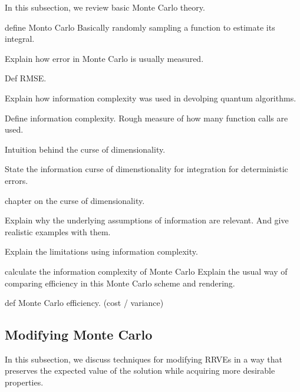 \documentclass[a4paper,12pt]{article}
\begin{document}
In this subsection, we review basic Monte Carlo theory. \\

\begin{definition}
    define Monto Carlo
    Basically randomly sampling a function to estimate its integral.
\end{definition}

Explain how error in Monte Carlo is usually measured.
\begin{definition}
    Def RMSE.
\end{definition}

Explain how information complexity was used in devolping quantum algorithms.
\begin{definition}
    Define information complexity.
    Rough measure of how many function calls are used.
\end{definition}

Intuition behind the curse of dimensionality.

\begin{theorem}
    State the information curse of dimenstionality for integration for
    deterministic errors.
\end{theorem}

\begin{related}
    \cite{foucart_mathematical_2022} chapter on the curse of dimensionality.
\end{related}

Explain why the underlying assumptions of information are relevant.
And give realistic examples with them.

Explain the limitations using information complexity.

calculate the information complexity of Monte Carlo
Explain the usual way of comparing efficiency in this Monte Carlo scheme
and rendering.
\begin{definition}
    def Monte Carlo efficiency. (cost / variance)
\end{definition}

\subsection{Modifying Monte Carlo}
In this subsection, we discuss techniques for modifying RRVEs
in a way that preserves the expected value of the solution while
acquiring more desirable properties. \\
\end{document}
